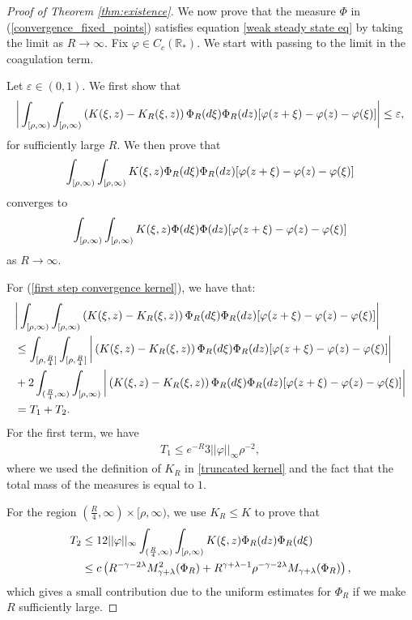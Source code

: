 \documentclass[11pt]{article}
\numberwithin{equation}{section}
\theoremstyle{plain}
\newcommand{\der}{\textup{d}}
\begin{document}
\begin{proof}[Proof of Theorem \ref{thm:existence}]
We now prove that the measure $\Phi $ in (\ref{convergence_fixed_points}) satisfies equation \eqref{weak steady state eq} by taking the limit as $R \rightarrow \infty$. Fix $\varphi\in C_{c}(\mathbb{R}_{\ast})$.
We start with passing to the limit in the coagulation term.

Let $\varepsilon\in(0,1)$. We first show that 
\begin{align}\label{first step convergence kernel}
   \bigg| \int_{[\rho,\infty)}\int_{[\rho,\infty)}\left(K (\xi,z)- K_{R}(\xi,z) \right)\Phi_{R}(\der \xi)\Phi_{R}(\der z)[\varphi(z+\xi)-\varphi(z)-\varphi(\xi)] \bigg|\leq \varepsilon,
\end{align}
for sufficiently large $R$. We then prove that 
\begin{align}\label{second step convergence kernel}
    \int_{[\rho,\infty)}\int_{[\rho,\infty)} K(\xi,z) \Phi_{R}(\der \xi)\Phi_{R}(\der z)[\varphi(z+\xi)-\varphi(z)-\varphi(\xi)] 
\end{align}
converges to
\begin{align}\label{second step convergence kernel 2}
    \int_{[\rho,\infty)}\int_{[\rho,\infty)}K (\xi,z)\Phi(\der \xi)\Phi(\der z)[\varphi(z+\xi)-\varphi(z)-\varphi(\xi)] 
\end{align}
as $R \rightarrow \infty .$

For (\ref{first step convergence kernel}), we have that: 
\begin{align*}
   &\bigg| \int_{[\rho,\infty)}\int_{[\rho,\infty)}\left(K (\xi,z)- K_{R}(\xi,z) \right)\Phi_{R}(\der \xi)\Phi_{R}(\der z)[\varphi(z+\xi)-\varphi(z)-\varphi(\xi)] \bigg|  \\
   &\leq \int_{[\rho,\frac{R}{4}]}\int_{[\rho,\frac{R}{4}]}\bigg|\left(K (\xi,z)- K_{R}(\xi,z) \right)\Phi_{R}(\der \xi)\Phi_{R}(\der z)[\varphi(z+\xi)-\varphi(z)-\varphi(\xi)] \bigg| \\
   &+ 2\int_{(\frac{R}{4},\infty)}\int_{[\rho,\infty)}\bigg|\left(K (\xi,z)- K_{R}(\xi,z) \right)\Phi_{R}(\der \xi)\Phi_{R}(\der z)[\varphi(z+\xi)-\varphi(z)-\varphi(\xi)] \bigg|\\
   &=T_{1}+T_{2}.
\end{align*}
For the first term, we have  
\begin{align*}
    T_{1}\leq e^{-R}3||\varphi||_{\infty}\rho^{-2},
\end{align*}
where we used the definition of $K_{R}$ in \eqref{truncated kernel} and the fact that the total mass of the measures is equal to $1$.

For the region $(\frac{R}{4}, \infty)\times[\rho, \infty)$, we use $K_R \leq K$ to prove that 
\begin{align*}
    T_{2}&\leq 12||\varphi||_{\infty}
        \int_{(\frac{R}{4},\infty)}\int_{[\rho,\infty)} K(\xi,z) \Phi_{R}(\der z)\Phi_{R}(\der \xi)\\     & \leq c \left(  R^{-\gamma-2\lambda}M_{\gamma+\lambda}^{2}(\Phi_{R}) +R^{\gamma+\lambda-1}\rho^{-\gamma-2\lambda}  M_{\gamma+\lambda}(\Phi_{R}) \right),
\end{align*}
which gives a small contribution due to the uniform estimates for $\Phi_{R}$ if we make $R$ sufficiently large.



\end{proof}
\end{document}
